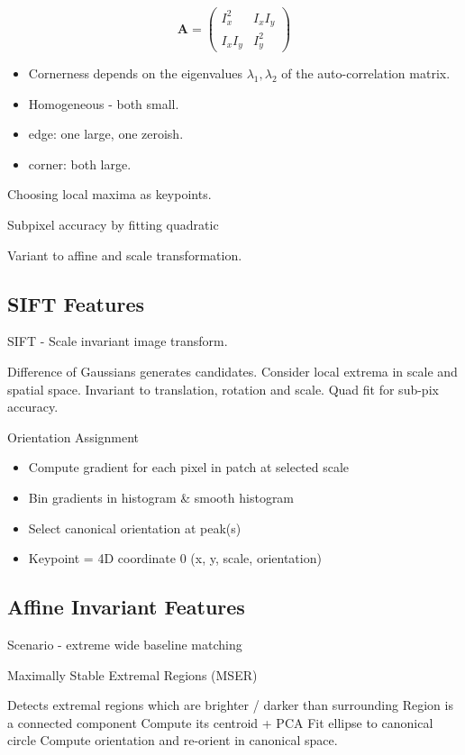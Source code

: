\begin{enumerate}
$$ 
\mathbf{A} = \left(  \begin{matrix} I_x^2 &  I_xI_y \\
I_xI_y & I_y^2
\end{matrix} \right) $$

\begin{itemize}
\item Cornerness depends on the eigenvalues $\lambda_1,\lambda_2$ of the auto-correlation matrix.
\item Homogeneous - both small.
\item edge: one large, one zeroish.
\item corner: both large.
\end{itemize}

Choosing local maxima as keypoints. 

Subpixel accuracy by fitting quadratic 

Variant to affine and scale transformation.

\subsection{SIFT Features}

SIFT - Scale invariant image transform.

Difference of Gaussians generates candidates. 
Consider local extrema in scale and spatial space.
Invariant to translation, rotation and scale.
Quad fit for sub-pix accuracy.

Orientation Assignment
\begin{itemize}
\item  Compute gradient for each pixel in patch at selected scale
\item  Bin gradients in histogram \& smooth histogram
\item  Select canonical orientation at peak(s)
\item  Keypoint = 4D coordinate 0 (x, y, scale, orientation)
\end{itemize}

\subsection{Affine Invariant Features}
Scenario - extreme wide baseline matching

Maximally Stable Extremal Regions (MSER)

Detects extremal regions which are brighter / darker than surrounding
Region is a connected component
Compute its centroid + PCA
Fit ellipse to canonical circle
Compute orientation and re-orient in canonical space.


\end{enumerate}
